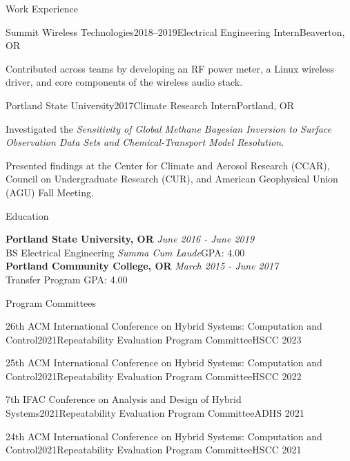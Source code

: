 \documentclass{resume}
\begin{document}
\begin{rSection}{Work Experience}
\begin{rSubsection}{Summit Wireless Technologies}{2018--2019}{Electrical Engineering Intern}{Beaverton, OR}
\item Contributed across teams by developing an RF power meter, a Linux wireless driver, and core components of the wireless audio stack.
\end{rSubsection}

\begin{rSubsection}{Portland State University}{2017}{Climate Research Intern}{Portland, OR}
\item Investigated the \textit{Sensitivity of Global Methane Bayesian Inversion to Surface Observation Data Sets and Chemical-Transport Model Resolution}.
\item Presented findings at the Center for Climate and Aerosol Research (CCAR), Council on Undergraduate Research (CUR), and American Geophysical Union (AGU) Fall Meeting.
\end{rSubsection}

\end{rSection}

\begin{rSection}{Education}

{\bf Portland State University, OR} \hfill {\em June 2016 - June 2019} 
\\ BS Electrical Engineering \quad \textit{Summa Cum Laude}\hfill {GPA: 4.00}
\\{\bf Portland Community College, OR} \hfill {\em March 2015 - June 2017} 
\\ Transfer Program \hfill {GPA: 4.00}

\end{rSection}

\begin{rSection}{Program Committees}

\begin{rSubsectionEmpty}{26th ACM International Conference on Hybrid Systems: Computation and Control}{2021}{Repeatability Evaluation Program Committee}{HSCC 2023}
\end{rSubsectionEmpty}

\begin{rSubsectionEmpty}{25th ACM International Conference on Hybrid Systems: Computation and Control}{2021}{Repeatability Evaluation Program Committee}{HSCC 2022}
\end{rSubsectionEmpty}

\begin{rSubsectionEmpty}{7th IFAC Conference on Analysis and Design of Hybrid Systems}{2021}{Repeatability Evaluation Program Committee}{ADHS 2021}
\end{rSubsectionEmpty}

\begin{rSubsectionEmpty}{24th ACM International Conference on Hybrid Systems: Computation and Control}{2021}{Repeatability Evaluation Program Committee}{HSCC 2021}
\end{rSubsectionEmpty}

\end{rSection}
\end{document}
